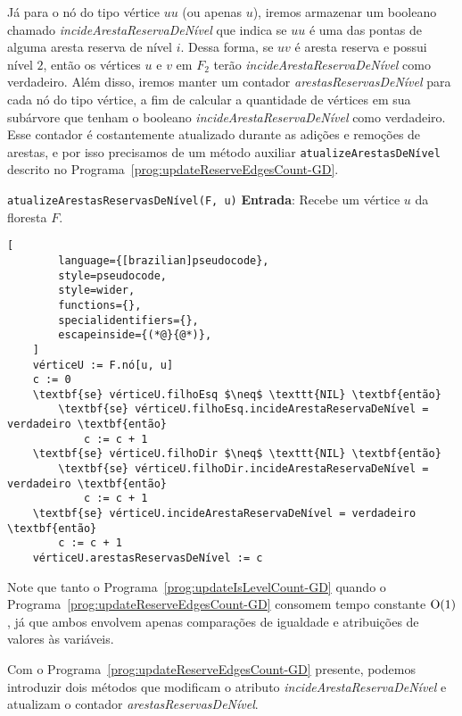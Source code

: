 Já para o nó do tipo vértice $uu$ (ou apenas $u$), iremos armazenar um booleano chamado \textit{incideArestaReservaDeNível} que indica se $uu$ é uma das pontas de alguma aresta reserva de nível $i$. Dessa forma, se $uv$ é aresta reserva e possui nível $2$, então os vértices $u$ e $v$ em $F_2$ terão \textit{incideArestaReservaDeNível} como verdadeiro. Além disso, iremos manter um contador \textit{arestasReservasDeNível} para cada nó do tipo vértice, a fim de calcular a quantidade de vértices em sua subárvore que tenham o booleano \textit{incideArestaReservaDeNível} como verdadeiro. Esse contador é costantemente atualizado durante as adições e remoções de arestas, e por isso precisamos de um método auxiliar \texttt{atualizeArestasDeNível} descrito no Programa~\ref{prog:updateReserveEdgesCount-GD}.

\begin{programruledcaption}{\texttt{atualizeArestasReservasDeNível(F, u)} \label{prog:updateReserveEdgesCount-GD}}
    \noindent\textbf{Entrada}: Recebe um vértice $u$ da floresta $F$.
    \vspace{-0.5\baselineskip}
    \begin{lstlisting}[
        language={[brazilian]pseudocode},
        style=pseudocode,
        style=wider,
        functions={},
        specialidentifiers={},
        escapeinside={(*@}{@*)},
    ]
    vérticeU := F.nó[u, u]
    c := 0
    \textbf{se} vérticeU.filhoEsq $\neq$ \texttt{NIL} \textbf{então}
        \textbf{se} vérticeU.filhoEsq.incideArestaReservaDeNível = verdadeiro \textbf{então}
            c := c + 1
    \textbf{se} vérticeU.filhoDir $\neq$ \texttt{NIL} \textbf{então}
        \textbf{se} vérticeU.filhoDir.incideArestaReservaDeNível = verdadeiro \textbf{então}
            c := c + 1
    \textbf{se} vérticeU.incideArestaReservaDeNível = verdadeiro \textbf{então}
        c := c + 1
    vérticeU.arestasReservasDeNível := c
    \end{lstlisting}
    \vspace{-0.5\baselineskip}
\end{programruledcaption}
Note que tanto o Programa~\ref{prog:updateIsLevelCount-GD} quando o Programa~\ref{prog:updateReserveEdgesCount-GD} consomem tempo constante $\mathrm{O}(1)$, já que ambos envolvem apenas comparações de igualdade e atribuições de valores às variáveis.

Com o Programa~\ref{prog:updateReserveEdgesCount-GD} presente, podemos introduzir dois métodos que modificam o atributo \textit{incideArestaReservaDeNível} e atualizam o contador \textit{arestasReservasDeNível}.

